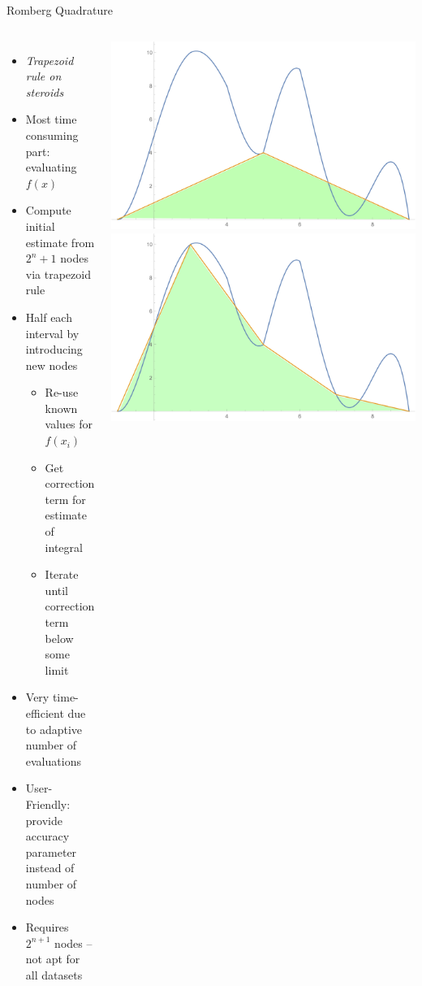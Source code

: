 
\begin{frame}{Romberg Quadrature}
%
\begin{columns}
\begin{itemize}
\item \emph{Trapezoid rule on steroids}
\item Most time consuming part: evaluating $f(x)$
\item Compute initial estimate from $2^n + 1$ nodes via trapezoid rule
\item Half each interval by introducing new nodes
	\begin{itemize}
	\item Re-use known values for $f(x_i)$
	\item Get correction term for estimate of integral
	\item Iterate until correction term below some limit
	\end{itemize}
\item Very time-efficient due to adaptive number of evaluations
\item User-Friendly: provide accuracy parameter instead of number of nodes
\item Requires $2^{n+1}$ nodes -- not apt for all datasets
\end{itemize}
%
\includegraphics[width=\linewidth]{./gfx/06-romberg-01}
\includegraphics[width=\linewidth]{./gfx/06-romberg-02}

\end{columns}
\end{frame}
